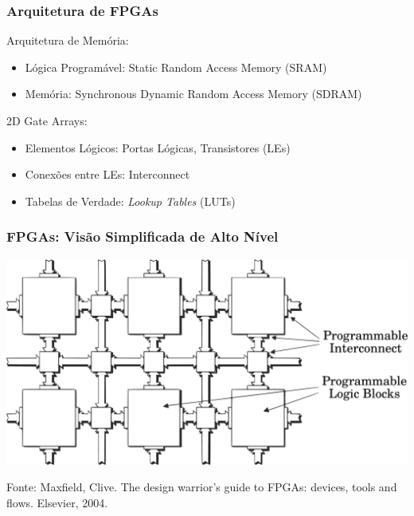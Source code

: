 \documentclass[10pt, compress]{beamer}
\begin{document}
\begin{frame}
    \frametitle{Arquitetura de FPGAs}
    Arquitetura de Memória:
    \begin{itemize}
        \item Lógica Programável: Static Random Access Memory (\alert{SRAM})
        \item Memória: Synchronous Dynamic Random Access Memory (\alert{SDRAM})
    \end{itemize}

    \pause
    \alert{2D Gate Arrays}:

    \begin{itemize}
        \item Elementos Lógicos: Portas Lógicas, Transistores (\alert{LEs})
        \item Conexões entre LEs: \alert{Interconnect}
        \item Tabelas de Verdade: \textit{Lookup Tables} (\alert{LUTs})
    \end{itemize}
\end{frame}

\begin{frame}[fragile]
    \frametitle{FPGAs: Visão Simplificada de Alto Nível}
    \begin{center}
        \includegraphics[width=\textwidth]{FPGA_simple}
    \end{center}

    \vfill

    \begin{center}
        \scriptsize{Fonte: Maxfield, Clive. The design warrior's guide to FPGAs: devices, tools and flows. Elsevier, 2004.}
    \end{center}
\end{frame}
\end{document}
